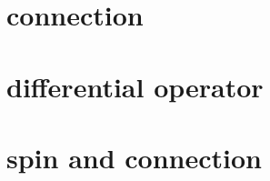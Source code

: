 \documentclass[dvipdfmx]{jsarticle}
\begin{document}
\section{connection}


\section{differential operator}


\section{spin and connection}

\end{document}
